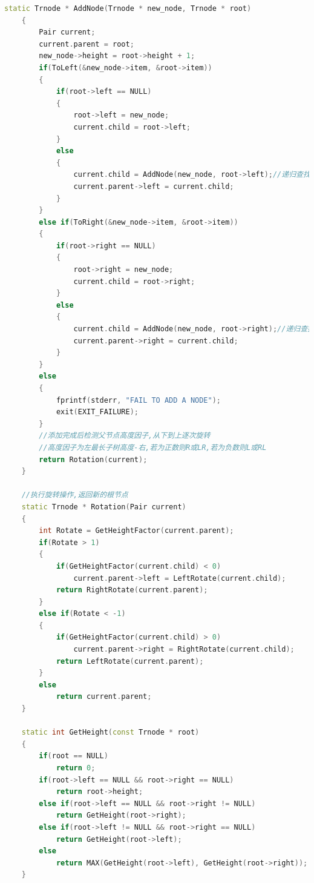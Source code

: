 \documentclass[12pt, a4paper, oneside]{ctexart}
\begin{document}
\begin{framed}
\begin{lstlisting}[language=C++]
    static Trnode * AddNode(Trnode * new_node, Trnode * root)
    {   
        Pair current;
        current.parent = root;
        new_node->height = root->height + 1;  
        if(ToLeft(&new_node->item, &root->item))
        {  
            if(root->left == NULL)
            {
                root->left = new_node;
                current.child = root->left;
            }
            else
            {
                current.child = AddNode(new_node, root->left);//递归查找子树
                current.parent->left = current.child;
            }
        }
        else if(ToRight(&new_node->item, &root->item))
        {
            if(root->right == NULL)
            {
                root->right = new_node;
                current.child = root->right;
            }
            else
            {
                current.child = AddNode(new_node, root->right);//递归查找子树
                current.parent->right = current.child;
            }
        }
        else
        {
            fprintf(stderr, "FAIL TO ADD A NODE");
            exit(EXIT_FAILURE);
        }
        //添加完成后检测父节点高度因子,从下到上逐次旋转
        //高度因子为左最长子树高度-右,若为正数则R或LR,若为负数则L或RL
        return Rotation(current);
    }
    
    //执行旋转操作,返回新的根节点
    static Trnode * Rotation(Pair current)
    {
        int Rotate = GetHeightFactor(current.parent);
        if(Rotate > 1)
        {   
            if(GetHeightFactor(current.child) < 0)
                current.parent->left = LeftRotate(current.child);
            return RightRotate(current.parent);
        }
        else if(Rotate < -1)
        {   
            if(GetHeightFactor(current.child) > 0)
                current.parent->right = RightRotate(current.child);
            return LeftRotate(current.parent);
        }
        else
            return current.parent;
    }
    
    static int GetHeight(const Trnode * root)
    {   
        if(root == NULL)
            return 0;
        if(root->left == NULL && root->right == NULL)
            return root->height;
        else if(root->left == NULL && root->right != NULL)
            return GetHeight(root->right);
        else if(root->left != NULL && root->right == NULL)
            return GetHeight(root->left);
        else
            return MAX(GetHeight(root->left), GetHeight(root->right));
    }
    

\end{lstlisting}
\end{framed}
\end{document}
